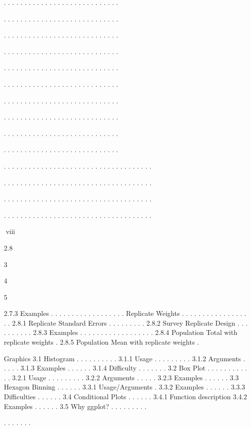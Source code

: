 .
.
.
.
.
.
.
.
.
.
.
.
.
.
.
.
.
.
.
.
.
.
.
.
.
.
.
.

.
.
.
.
.
.
.
.
.
.
.
.
.
.
.
.
.
.
.
.
.
.
.
.
.
.
.
.

.
.
.
.
.
.
.
.
.
.
.
.
.
.
.
.
.
.
.
.
.
.
.
.
.
.
.
.

.
.
.
.
.
.
.
.
.
.
.
.
.
.
.
.
.
.
.
.
.
.
.
.
.
.
.
.

.
.
.
.
.
.
.
.
.
.
.
.
.
.
.
.
.
.
.
.
.
.
.
.
.
.
.
.

.
.
.
.
.
.
.
.
.
.
.
.
.
.
.
.
.
.
.
.
.
.
.
.
.
.
.
.

.
.
.
.
.
.
.
.
.
.
.
.
.
.
.
.
.
.
.
.
.
.
.
.
.
.
.
.

.
.
.
.
.
.
.
.
.
.
.
.
.
.
.
.
.
.
.
.
.
.
.
.
.
.
.
.

.
.
.
.
.
.
.
.
.
.
.
.
.
.
.
.
.
.
.
.
.
.
.
.
.
.
.
.

.
.
.
.
.
.
.
.
.
.
.
.
.
.
.
.
.
.
.
.
.
.
.
.
.
.
.
.

.
.
.
.
.
.
.
.
.
.
.
.
.
.
.
.
.
.
.
.
.
.
.
.
.
.
.
.
.
.
.
.
.
.
.
.

.
.
.
.
.
.
.
.
.
.
.
.
.
.
.
.
.
.
.
.
.
.
.
.
.
.
.
.
.
.
.
.
.
.
.
.

.
.
.
.
.
.
.
.
.
.
.
.
.
.
.
.
.
.
.
.
.
.
.
.
.
.
.
.
.
.
.
.
.
.
.
.

.
.
.
.
.
.
.
.
.
.
.
.
.
.
.
.
.
.
.
.
.
.
.
.
.
.
.
.
.
.
.
.
.
.
.
.

viii

2.8

3

4

5

2.7.3 Examples . . . . . . . . . . . . . . . . . .
Replicate Weights . . . . . . . . . . . . . . . . . .
2.8.1 Replicate Standard Errors . . . . . . . . .
2.8.2 Survey Replicate Design . . . . . . . . . .
2.8.3 Examples . . . . . . . . . . . . . . . . . .
2.8.4 Population Total with replicate weights .
2.8.5 Population Mean with replicate weights .

Graphics
3.1 Histogram . . . . . . . . . .
3.1.1 Usage . . . . . . . . .
3.1.2 Arguments . . . . .
3.1.3 Examples . . . . . .
3.1.4 Difficulty . . . . . . .
3.2 Box Plot . . . . . . . . . . . .
3.2.1 Usage . . . . . . . . .
3.2.2 Arguments . . . . .
3.2.3 Examples . . . . . .
3.3 Hexagon Binning . . . . . .
3.3.1 Usage/Arguments .
3.3.2 Examples . . . . . .
3.3.3 Difficulties . . . . . .
3.4 Conditional Plots . . . . . .
3.4.1 Function description
3.4.2 Examples . . . . . .
3.5 Why ggplot? . . . . . . . . .

.
.
.
.
.
.
.

